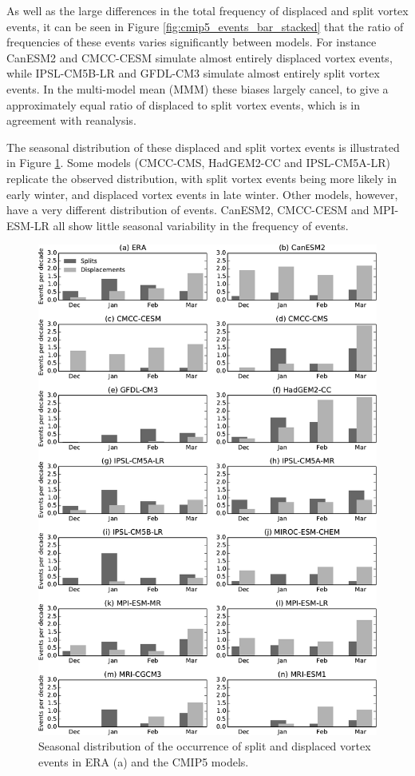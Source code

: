 As well as the large differences in the total frequency of displaced and split
vortex events, it can be seen in Figure \ref{fig:cmip5_events_bar_stacked} that
the ratio of frequencies of these events varies significantly between
models. For instance CanESM2 and CMCC-CESM simulate almost entirely displaced
vortex events, while IPSL-CM5B-LR and GFDL-CM3 simulate almost entirely split
vortex events. In the multi-model mean (MMM) these biases largely cancel, to
give a approximately equal ratio of displaced to split vortex events, which is
in agreement with reanalysis.

The seasonal distribution of these displaced and split vortex events is
illustrated in Figure \ref{fig:cmip5_events_seasonal}. Some models (CMCC-CMS,
HadGEM2-CC and IPSL-CM5A-LR) replicate the observed distribution, with split
vortex events being more likely in early winter, and displaced vortex events in
late winter. Other models, however, have a very different
distribution of events. CanESM2, CMCC-CESM and MPI-ESM-LR all show little
seasonal variability in the frequency of events. 


\begin{figure}
 \centering
 \noindent\includegraphics[width=\textwidth]{figures/chapter-models/events_seasonal.pdf}
 \caption[Seasonal distribution of splits and displacements in the CMIP5
 models]{Seasonal distribution of the occurrence of split and displaced vortex
   events in ERA (a) and the CMIP5 models.}
 \label{fig:cmip5_events_seasonal}
\end{figure}

